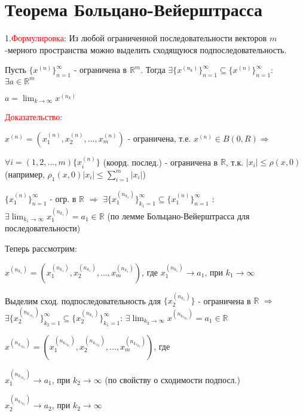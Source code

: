\section{Теорема Больцано-Вейерштрасса}

1.\textcolor{red}{Формулировка}: Из любой ограниченной последовательности векторов $m$-мерного пространства можно выделить сходящуюся подпоследовательность.

Пусть $\{x^{(n)}\}_{n=1}^{\infty}$ - ограничена в $\mathbb {R}^m$. Тогда $\exists \{x^{(n_k)}\}_{n=1}^{\infty} \subseteq \{x^{(n)}\}_{n=1}^{\infty}$: $\exists a \in \mathbb {R}^m$

$a = \lim_{k\to\infty} x^{(n_k)}$

\textcolor{red}{Доказательство}:

$x^{(n)} = (x^{(n)}_1, x^{(n)}_2, ..., x^{(n)}_m)$ - ограничена, т.е. $x^{(n)} \in B(0, R) \Rightarrow$ 

$\forall i=(1,2, ..., m) \{x^{(n)}_i\} $ (коорд. послед.) - ограничена в $\mathbb {R}$, т.к. $|x_i|\leq \rho(x, 0)$ (например, $\rho_1(x, 0) |x_i| \leq \sum_{i=1}^{m}|x_i|$)
\vspace{1cm}

$\{x^{(n)}_1\}^{\infty}_{n =1}$ - огр. в $\mathbb {R}$ $\Rightarrow $ $\exists \{x^{(n_{k_1})}_1\}_{k_1=1}^{\infty} \subseteq \{x^{(n)}_1\}_{n=1}^{\infty}$ : $ \exists \lim_{k_1\to\infty} x_1^{(n_{k_1})} = a_1 \in \mathbb {R}$ (по лемме Больцано-Вейерштрасса для последовательности)
\vspace{1cm}

Теперь рассмотрим:

$x^{(n_{k_1})} = (x^{(n_{k_1})}_1, x^{(n_{k_1})}_2, ..., x^{(n_{k_1})}_m)$, где $x^{(n_{k_1})}_1 \rightarrow a_1$, при $k_1 \rightarrow \infty$

Выделим сход. подпоследовательность для $\{x^{(n_{k_1})}_2\}$ - ограничена в $\mathbb {R}$ $\Rightarrow $
$\exists \{x^{(n_{{k_1}_{k_2}})}_2\}_{k_2=1}^{\infty} \subseteq \{x^{(n_{k_1})}_2\}_{k_1=1}^{\infty}$: $ \exists \lim_{k_2\to\infty} x^{(n_{{k_1}_{k_2}})} = a_1 \in \mathbb {R}$
\vspace{1cm}

$x^{(n_{{k_1}_{k_2}})} = (x^{(n_{{k_1}_{k_2}})}_1, x^{(n_{{k_1}_{k_2}})}_2, ..., x^{(n_{{k_1}_{k_2}})}_m)$, где

$x^{(n_{{k_1}_{k_2}})}_1 \rightarrow a_1$, при  $k_2 \rightarrow \infty$ (по свойству о сходимости подпосл.)

$x^{(n_{{k_1}_{k_2}})}_2 \rightarrow a_2$, при  $k_2 \rightarrow \infty$

